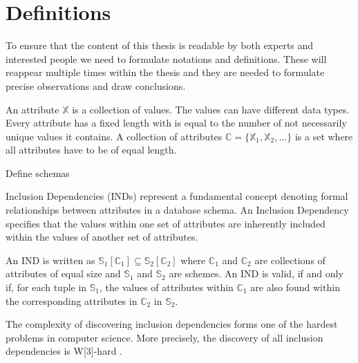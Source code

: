 \chapter{Definitions}

To ensure that the content of this thesis is readable by both experts and interested people we need to formulate notations and definitions. These will reappear multiple times within the thesis and they are needed to formulate precise observations and draw conclusions.

\begin{definition}[Attributes]\label{def:attributes}
    An attribute $\mathbb{X}$ is a collection of values. The values can have different data types. Every attribute has a fixed length with is equal to the number of not necessarily unique values it contains. A collection of attributes $\mathbb{C} = \{\mathbb{X}_1, \mathbb{X}_2, ... \}$ is a set where all attributes have to be of equal length.
\end{definition}

\begin{definition}[Schemas]\label{def:schema}
    Define schemas
\end{definition}


Inclusion Dependencies (INDs) represent a fundamental concept denoting formal relationships between attributes in a database schema. An Inclusion Dependency specifies that the values within one set of attributes are inherently included within the values of another set of attributes.

\begin{definition}\label{def:inds}
    An IND is written as $\mathbb{S}_1[\mathbb{C}_1] \subseteq \mathbb{S}_2[\mathbb{C}_2]$ where $\mathbb{C}_1$ and $\mathbb{C}_2$ are collections of attributes of equal size and $\mathbb{S}_1$ and $\mathbb{S}_2$ are schemes. An IND is valid, if and only if, for each tuple in $\mathbb{S}_1$, the values of attributes within $\mathbb{C}_1$ are also found within the corresponding attributes in $\mathbb{C}_2$ in $\mathbb{S}_2$.
\end{definition}

The complexity of discovering inclusion dependencies forms one of the hardest problems in computer science. More precisely, the discovery of all inclusion dependencies is W[3]-hard \cite{blasius2017parameterized}. %

